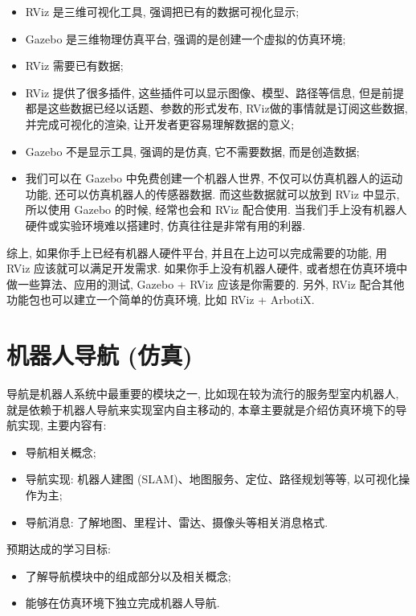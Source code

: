 \documentclass[openany, fontset=windowsold]{ctexbook}
\theoremstyle{kaiti}
\theoremstyle{normal}
\begin{document}
\begin{itemize}
  \item RViz 是三维可视化工具, 强调把已有的数据可视化显示;
  \item Gazebo 是三维物理仿真平台, 强调的是创建一个虚拟的仿真环境; 
  \item RViz 需要已有数据; 
  \item RViz 提供了很多插件, 这些插件可以显示图像、模型、路径等信息, 但是前提都是这些数据已经以话题、参数的形式发布, RViz做的事情就是订阅这些数据, 并完成可视化的渲染, 让开发者更容易理解数据的意义; 
  \item Gazebo 不是显示工具, 强调的是仿真, 它不需要数据, 而是创造数据; 
  \item 我们可以在 Gazebo 中免费创建一个机器人世界, 不仅可以仿真机器人的运动功能, 还可以仿真机器人的传感器数据. 而这些数据就可以放到 RViz 中显示, 所以使用 Gazebo 的时候, 经常也会和 RViz 配合使用. 当我们手上没有机器人硬件或实验环境难以搭建时, 仿真往往是非常有用的利器.
\end{itemize}

综上, 如果你手上已经有机器人硬件平台, 并且在上边可以完成需要的功能, 用 RViz 应该就可以满足开发需求. 如果你手上没有机器人硬件, 或者想在仿真环境中做一些算法、应用的测试, Gazebo + RViz 应该是你需要的. 另外, RViz 配合其他功能包也可以建立一个简单的仿真环境, 比如 RViz + ArbotiX.

\chapter{机器人导航 (仿真)}
\label{chapter:robot_navigation_simulation}

导航是机器人系统中最重要的模块之一, 比如现在较为流行的服务型室内机器人, 就是依赖于机器人导航来实现室内自主移动的, 本章主要就是介绍仿真环境下的导航实现, 主要内容有:

\begin{itemize}
  \item 导航相关概念;
  \item 导航实现: 机器人建图 (SLAM)、地图服务、定位、路径规划等等, 以可视化操作为主;
  \item 导航消息: 了解地图、里程计、雷达、摄像头等相关消息格式.
\end{itemize}

预期达成的学习目标:

\begin{itemize}
  \item 了解导航模块中的组成部分以及相关概念;
  \item 能够在仿真环境下独立完成机器人导航.
\end{itemize}
\end{document}
